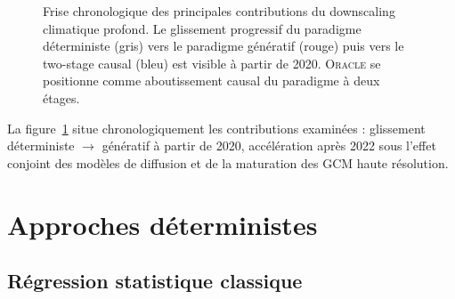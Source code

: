 \documentclass[14pt,a4paper,openany]{extreport}
\newcommand{\Oracle}{\textsc{Oracle}}
\begin{document}
\begin{figure}[ht]
{%
  }
  \caption[Frise chronologique du downscaling]{Frise chronologique des principales contributions du downscaling climatique profond. Le glissement progressif du paradigme déterministe (gris) vers le paradigme génératif (rouge) puis vers le two-stage causal (bleu) est visible à partir de 2020. \Oracle{} se positionne comme aboutissement causal du paradigme à deux étages.}
  \label{fig:frise}
\end{figure}

La figure~\ref{fig:frise} situe chronologiquement les contributions examinées : glissement déterministe $\to$ génératif à partir de 2020, accélération après 2022 sous l'effet conjoint des modèles de diffusion et de la maturation des GCM haute résolution.

\section{Approches déterministes}
\label{sec:soa-det}

\subsection{Régression statistique classique}
\label{ssec:soa-reg-classique}
\end{document}
